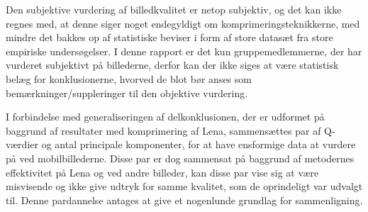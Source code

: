 Den subjektive vurdering af billedkvalitet er netop subjektiv, og det kan ikke regnes med, at denne siger noget endegyldigt om komprimeringsteknikkerne, med mindre det bakkes op af statistiske beviser i form af store datasæt fra store empiriske undersøgelser.
I denne rapport er det kun gruppemedlemmerne, der har vurderet subjektivt på billederne, derfor kan der ikke siges at være statistisk belæg for konklusionerne, hvorved de blot bør anses som bemærkninger/suppleringer til den objektive vurdering.

I forbindelse med generaliseringen af delkonklusionen, der er udformet på baggrund af resultater med komprimering af Lena, sammensættes par af Q-værdier og antal principale komponenter, for at have ensformige data at vurdere på ved mobilbillederne. Disse par er dog sammensat på baggrund af metodernes effektivitet på Lena og ved andre billeder, kan disse par vise sig at være misvisende og ikke give udtryk for samme kvalitet, som de oprindeligt var udvalgt til. Denne pardannelse antages at give et nogenlunde grundlag for sammenligning.